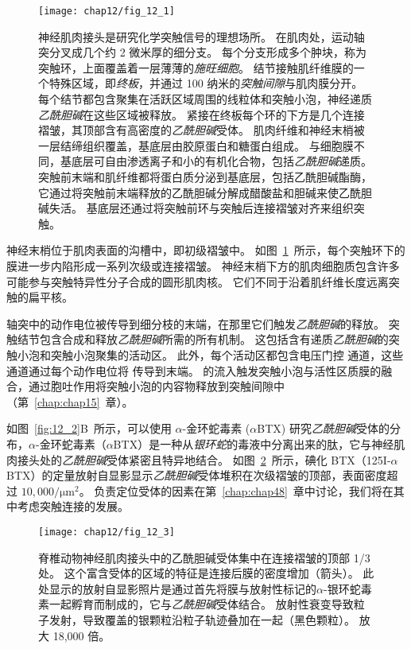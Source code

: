 \begin{figure}[htbp]
	\centering
	\texttt{[image: chap12/fig\_12\_1]}
	\caption{神经肌肉接头是研究化学突触信号的理想场所。
		在肌肉处，运动轴突分叉成几个约 2 微米厚的细分支。
		每个分支形成多个肿块，称为突触环，上面覆盖着一层薄薄的\textit{施旺细胞}。
		结节接触肌纤维膜的一个特殊区域，即\textit{终板}，并通过 100 纳米的\textit{突触间隙}与肌肉膜分开。
		每个结节都包含聚集在活跃区域周围的线粒体和突触小泡，神经递质\textit{乙酰胆碱}在这些区域被释放。
		紧接在终板每个环的下方是几个连接褶皱，其顶部含有高密度的\textit{乙酰胆碱}受体。
		肌肉纤维和神经末梢被一层结缔组织覆盖，基底层由胶原蛋白和糖蛋白组成。
		与细胞膜不同，基底层可自由渗透离子和小的有机化合物，包括\textit{乙酰胆碱}递质。
		突触前末端和肌纤维都将蛋白质分泌到基底层，包括乙酰胆碱酯酶，它通过将突触前末端释放的乙酰胆碱分解成醋酸盐和胆碱来使乙酰胆碱失活。
		基底层还通过将突触前环与突触后连接褶皱对齐来组织突触\cite{mcmahan1971visual}。}
	\label{fig:12_1}
\end{figure}


神经末梢位于肌肉表面的沟槽中，即初级褶皱中。
如图~\ref{fig:12_1}~所示，每个突触环下的膜进一步内陷形成一系列次级或连接褶皱。
神经末梢下方的肌肉细胞质包含许多可能参与突触特异性分子合成的圆形肌肉核。
它们不同于沿着肌纤维长度远离突触的扁平核。


轴突中的动作电位被传导到细分枝的末端，在那里它们触发\textit{乙酰胆碱}的释放。
突触结节包含合成和释放\textit{乙酰胆碱}所需的所有机制。
这包括含有递质\textit{乙酰胆碱}的突触小泡和突触小泡聚集的活动区。
此外，每个活动区都包含电压门控  通道，这些通道通过每个动作电位将  传导到末端。
 的流入触发突触小泡与活性区质膜的融合，通过胞吐作用将突触小泡的内容物释放到突触间隙中（第~\ref{chap:chap15}~章）。


如图~\ref{fig:12_2}B~所示，可以使用 $\alpha$-金环蛇毒素 ($\alpha$BTX) 研究\textit{乙酰胆碱}受体的分布，$\alpha$-金环蛇毒素（$\alpha$BTX）是一种从\textit{银环蛇}的毒液中分离出来的肽，它与神经肌肉接头处的\textit{乙酰胆碱}受体紧密且特异地结合。
如图~\ref{fig:12_3}~所示，碘化 BTX（125I-$\alpha$BTX）的定量放射自显影显示\textit{乙酰胆碱}受体堆积在次级褶皱的顶部，表面密度超过 $10,000/\mathrm{\mu m}^2$。
负责定位受体的因素在第~\ref{chap:chap48}~章中讨论，我们将在其中考虑突触连接的发展。


\begin{figure}[htbp]
	\centering
	\texttt{[image: chap12/fig\_12\_3]}
	\caption{脊椎动物神经肌肉接头中的乙酰胆碱受体集中在连接褶皱的顶部 1/3 处。
		这个富含受体的区域的特征是连接后膜的密度增加（箭头）。
		此处显示的放射自显影照片是通过首先将膜与放射性标记的$\alpha$-银环蛇毒素一起孵育而制成的，它与\textit{乙酰胆碱}受体结合。
		放射性衰变导致粒子发射，导致覆盖的银颗粒沿粒子轨迹叠加在一起（黑色颗粒）。
		放大 18,000 倍。}
	\label{fig:12_3}
\end{figure}



